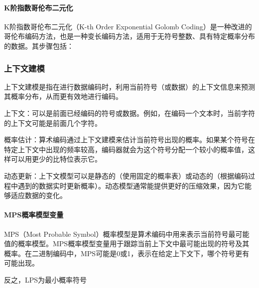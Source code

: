 \documentclass{/Users/hi/Study/template/code}
\begin{document}
\paragraph{K阶指数哥伦布二元化}
K阶指数哥伦布二元化（K-th Order Exponential Golomb Coding）是一种改进的哥伦布编码方法，也是一种变长编码方法，适用于无符号整数、具有特定概率分布的数据。其步骤包括：

\subsubsection{上下文建模}
\begin{definition}
	上下文建模是指在进行数据编码时，利用当前符号（或数据）的上下文信息来预测其概率分布，从而更有效地进行编码。
\end{definition}

上下文：可以是前面已经编码的符号或数据。例如，在编码一个文本时，当前字符的上下文可能是前面几个字符。

概率估计：算术编码通过上下文建模来估计当前符号出现的概率。如果某个符号在特定上下文中出现的频率较高，编码器就会为这个符号分配一个较小的概率值，这样可以用更少的比特位表示它。

动态更新：上下文模型可以是静态的（使用固定的概率表）或动态的（根据编码过程中遇到的数据实时更新概率）。动态模型通常能提供更好的压缩效果，因为它能够适应数据的变化。


\paragraph{MPS概率模型变量}
\begin{definition}
	MPS（Most Probable Symbol）概率模型是算术编码中用来表示当前符号最可能值的概率模型。MPS概率模型变量用于跟踪当前上下文中最可能出现的符号及其概率。在二进制编码中，MPS可能是0或1，表示在给定上下文下，哪个符号更有可能出现。
\end{definition}
\begin{remark}
	反之，LPS为最小概率符号
\end{remark}
\end{document}
